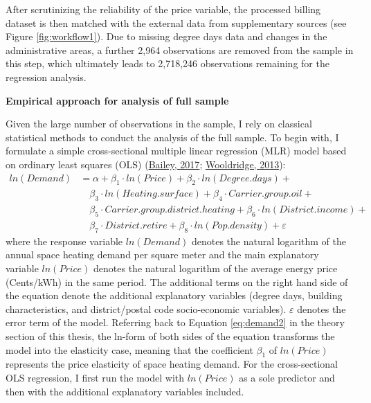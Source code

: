 \documentclass[12pt,twoside]{reedthesis}
\begin{document}
After scrutinizing the reliability of the price variable, the processed billing dataset is then matched with the external data from supplementary sources (see Figure \ref{fig:workflow1}). Due to missing degree days data and changes in the administrative areas, a further 2,964 observations are removed from the sample in this step, which ultimately leads to 2,718,246 observations remaining for the regression analysis.

\textbf{Empirical approach for analysis of full sample}

Given the large number of observations in the sample, I rely on classical statistical methods to conduct the analysis of the full sample. To begin with, I formulate a simple cross-sectional multiple linear regression (MLR) model based on ordinary least squares (OLS) (\protect\hyperlink{ref-bailey17}{Bailey, 2017}; \protect\hyperlink{ref-wooldridge13}{Wooldridge, 2013}):
\begin{align*}
ln(Demand) & = \alpha + \beta_1 \cdot ln(Price) + \beta_2 \cdot ln(Degree.days) + \\
 & \quad \beta_3 \cdot ln(Heating.surface) + \beta_{4} \cdot Carrier.group.oil + \\
 & \quad \beta_{5} \cdot Carrier.group.district.heating + \beta_{6} \cdot ln(District.income) + \\
 & \quad \beta_{7} \cdot District.retire + \beta_{8} \cdot ln(Pop.density) + \varepsilon 
\end{align*}
where the response variable \(ln(Demand)\) denotes the natural logarithm of the annual space heating demand per square meter and the main explanatory variable \(ln(Price)\) denotes the natural logarithm of the average energy price (Cents/kWh) in the same period. The additional terms on the right hand side of the equation denote the additional explanatory variables (degree days, building characteristics, and district/postal code socio-economic variables). \(\varepsilon\) denotes the error term of the model. Referring back to Equation \eqref{eq:demand2} in the theory section of this thesis, the ln-form of both sides of the equation transforms the model into the elasticity case, meaning that the coefficient \(\beta_1\) of \(ln(Price)\) represents the price elasticity of space heating demand. For the cross-sectional OLS regression, I first run the model with \(ln(Price)\) as a sole predictor and then with the additional explanatory variables included.
\end{document}
